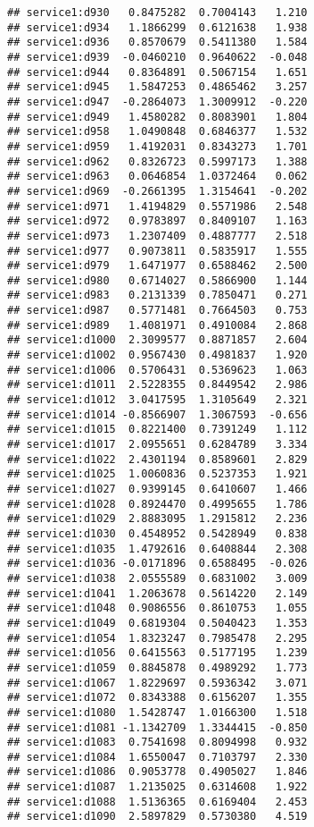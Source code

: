 \documentclass[
]{article}
\begin{document}
\begin{verbatim}
## service1:d930   0.8475282  0.7004143   1.210
## service1:d934   1.1866299  0.6121638   1.938
## service1:d936   0.8570679  0.5411380   1.584
## service1:d939  -0.0460210  0.9640622  -0.048
## service1:d944   0.8364891  0.5067154   1.651
## service1:d945   1.5847253  0.4865462   3.257
## service1:d947  -0.2864073  1.3009912  -0.220
## service1:d949   1.4580282  0.8083901   1.804
## service1:d958   1.0490848  0.6846377   1.532
## service1:d959   1.4192031  0.8343273   1.701
## service1:d962   0.8326723  0.5997173   1.388
## service1:d963   0.0646854  1.0372464   0.062
## service1:d969  -0.2661395  1.3154641  -0.202
## service1:d971   1.4194829  0.5571986   2.548
## service1:d972   0.9783897  0.8409107   1.163
## service1:d973   1.2307409  0.4887777   2.518
## service1:d977   0.9073811  0.5835917   1.555
## service1:d979   1.6471977  0.6588462   2.500
## service1:d980   0.6714027  0.5866900   1.144
## service1:d983   0.2131339  0.7850471   0.271
## service1:d987   0.5771481  0.7664503   0.753
## service1:d989   1.4081971  0.4910084   2.868
## service1:d1000  2.3099577  0.8871857   2.604
## service1:d1002  0.9567430  0.4981837   1.920
## service1:d1006  0.5706431  0.5369623   1.063
## service1:d1011  2.5228355  0.8449542   2.986
## service1:d1012  3.0417595  1.3105649   2.321
## service1:d1014 -0.8566907  1.3067593  -0.656
## service1:d1015  0.8221400  0.7391249   1.112
## service1:d1017  2.0955651  0.6284789   3.334
## service1:d1022  2.4301194  0.8589601   2.829
## service1:d1025  1.0060836  0.5237353   1.921
## service1:d1027  0.9399145  0.6410607   1.466
## service1:d1028  0.8924470  0.4995655   1.786
## service1:d1029  2.8883095  1.2915812   2.236
## service1:d1030  0.4548952  0.5428949   0.838
## service1:d1035  1.4792616  0.6408844   2.308
## service1:d1036 -0.0171896  0.6588495  -0.026
## service1:d1038  2.0555589  0.6831002   3.009
## service1:d1041  1.2063678  0.5614220   2.149
## service1:d1048  0.9086556  0.8610753   1.055
## service1:d1049  0.6819304  0.5040423   1.353
## service1:d1054  1.8323247  0.7985478   2.295
## service1:d1056  0.6415563  0.5177195   1.239
## service1:d1059  0.8845878  0.4989292   1.773
## service1:d1067  1.8229697  0.5936342   3.071
## service1:d1072  0.8343388  0.6156207   1.355
## service1:d1080  1.5428747  1.0166300   1.518
## service1:d1081 -1.1342709  1.3344415  -0.850
## service1:d1083  0.7541698  0.8094998   0.932
## service1:d1084  1.6550047  0.7103797   2.330
## service1:d1086  0.9053778  0.4905027   1.846
## service1:d1087  1.2135025  0.6314608   1.922
## service1:d1088  1.5136365  0.6169404   2.453
## service1:d1090  2.5897829  0.5730380   4.519

\end{verbatim}
\end{document}
